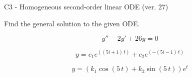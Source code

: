 \begin{exercise}
  \begin{exerciseTitle}C3 - Homogeneous second-order linear ODE (ver. 27)\end{exerciseTitle}
  \begin{exerciseStatement}
    
Find the general solution to the given ODE.

    
\[y''-2y'+26y = 0\]

  \end{exerciseStatement}
  \begin{exerciseAnswer}
    
\[y= c_{1} e^{\left(\left(5 i + 1\right) \, t\right)} + c_{2} e^{\left(-\left(5 i - 1\right) \, t\right)}\]

    
\[y= {\left(k_{1} \cos\left(5 \, t\right) + k_{2} \sin\left(5 \, t\right)\right)} e^{t}\]

  \end{exerciseAnswer}
\end{exercise}